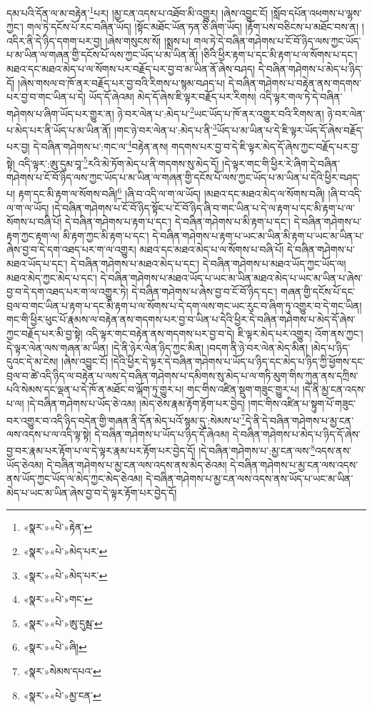 དམ་པའི་དོན་ལ་མ་བརྟེན་\footnote{«སྣར་»«པེ་»རྟེན་}པར། །མྱ་ངན་འདས་པ་འཐོབ་མི་འགྱུར། །ཞེས་འབྱུང་ངོ། །སློབ་དཔོན་འཕགས་པ་ལྷས་ཀྱང་། གལ་ཏེ་དངོས་པོ་རང་བཞིན་ཡོད། །སྟོང་མཐོང་ཡོན་ཏན་ཅི་ཞིག་ཡོད། །རྟོག་པས་བཅིངས་པ་མཐོང་བས་ན། །འདིར་ནི་དེ་ཉིད་དགག་པར་བྱ། །ཞེས་གསུངས་སོ། །སྨྲས་པ། གལ་ཏེ་དེ་བཞིན་གཤེགས་པ་ངོ་བོ་ཉིད་ལས་ཀྱང་ཡོད་པ་མ་ཡིན་ལ་གཞན་གྱི་དངོས་པོ་ལས་ཀྱང་ཡོད་པ་མ་ཡིན་ནོ། །ཅིའི་ཕྱིར་རྟག་པ་དང་མི་རྟག་པ་ལ་སོགས་པ་དང་། མཐའ་དང་མཐའ་མེད་པ་ལ་སོགས་པར་བརྗོད་པར་བྱ་བ་མ་ཡིན་ནོ་ཞེས་བཤད། དེ་བཞིན་གཤེགས་པ་མེད་པ་ཉིད་དོ། །ཞེས་གསལ་བ་ཁོ་ནར་བརྗོད་པར་བྱ་བའི་རིགས་པ་སྙམ་བཤད་པ། དེ་བཞིན་གཤེགས་པ་བརྟེན་ནས་གདགས་པར་བྱ་བ་གང་ཡིན་པ་དེ། ཡོད་དོ་ཞེའམ། མེད་དོ་ཞེས་ཇི་ལྟར་བརྗོད་པར་རིགས། འདི་ལྟར་གལ་ཏེ་དེ་བཞིན་གཤེགས་པ་ཞིག་ཡོད་པར་གྱུར་ན། ཉེ་བར་ལེན་པ་:མེད་པ་\footnote{«སྣར་»«པེ་»མེད་པར་}ཡང་ཡོད་པ་ཁོ་ནར་འགྱུར་བའི་རིགས་ན། ཉེ་བར་ལེན་པ་མེད་པར་ནི་ཡོད་པ་མ་ཡིན་ནོ། །གང་ཉེ་བར་ལེན་པ་:མེད་པ་ནི་\footnote{«སྣར་»«པེ་»མེད་པར་}ཡོད་པ་མ་ཡིན་པ་དེ་ཇི་ལྟར་ཡོད་དོ་ཞེས་བརྗོད་པར་བྱ། དེ་བཞིན་གཤེགས་པ་:གང་ལ་\footnote{«སྣར་»«པེ་»གང་}བརྟེན་ནས། གདགས་པར་བྱ་བ་དེ་ཇི་ལྟར་མེད་དོ་ཞེས་ཀྱང་བརྗོད་པར་བྱ་སྟེ། འདི་ལྟར་:ཨུ་དུམ་བཱ་\footnote{«སྣར་»«པེ་»ཨུ་དུམྦ་}རའི་མེ་ཏོག་མེད་པ་ནི་གདགས་སུ་མེད་དོ། །དེ་ལྟར་གང་གི་ཕྱིར་རེ་ཞིག་དེ་བཞིན་གཤེགས་པ་ངོ་བོ་ཉིད་ལས་ཀྱང་ཡོད་པ་མ་ཡིན་ལ་གཞན་གྱི་དངོས་པོ་ལས་ཀྱང་ཡོད་པ་མ་ཡིན་པ་དེའི་ཕྱིར་བཤད་པ། རྟག་དང་མི་རྟག་ལ་སོགས་བཞི།\footnote{«སྣར་»«པེ་»ཞི།} །ཞི་བ་འདི་ལ་ག་ལ་ཡོད། །མཐའ་དང་མཐའ་མེད་ལ་སོགས་བཞི། །ཞི་བ་འདི་ལ་ག་ལ་ཡོད། །དེ་བཞིན་གཤེགས་པ་ངོ་བོ་ཉིད་སྟོང་པ་ངོ་བོ་ཉིད་ཞི་བ་གང་ཡིན་པ་དེ་ལ་རྟག་པ་དང་མི་རྟག་པ་ལ་སོགས་པ་བཞི་པོ། དེ་བཞིན་གཤེགས་པ་རྟག་པ་དང་། དེ་བཞིན་གཤེགས་པ་མི་རྟག་པ་དང་། དེ་བཞིན་གཤེགས་པ་རྟག་ཀྱང་རྟག་ལ། མི་རྟག་ཀྱང་མི་རྟག་པ་དང་། དེ་བཞིན་གཤེགས་པ་རྟག་པ་ཡང་མ་ཡིན་མི་རྟག་པ་ཡང་མ་ཡིན་པ་ཞེས་བྱ་བ་དེ་དག་འཐད་པར་ག་ལ་འགྱུར། མཐའ་དང་མཐའ་མེད་པ་ལ་སོགས་པ་བཞི་པོ། དེ་བཞིན་གཤེགས་པ་མཐའ་ཡོད་པ་དང་། དེ་བཞིན་གཤེགས་པ་མཐའ་མེད་པ་དང་། དེ་བཞིན་གཤེགས་པ་མཐའ་ཡོད་ཀྱང་ཡོད་ལ། མཐའ་མེད་ཀྱང་མེད་པ་དང་། དེ་བཞིན་གཤེགས་པ་མཐའ་ཡོད་པ་ཡང་མ་ཡིན་མཐའ་མེད་པ་ཡང་མ་ཡིན་པ་ཞེས་བྱ་བ་དེ་དག་འཐད་པར་ག་ལ་འགྱུར་ཏེ། དེ་བཞིན་གཤེགས་པ་ཞེས་བྱ་བ་ངོ་བོ་ཉིད་དང་། གཞན་གྱི་དངོས་པོ་དང་བྲལ་བ་གང་ཡིན་པ་རྟག་པ་དང་མི་རྟག་པ་ལ་སོགས་པ་དེ་དག་ལས་གང་ཡང་རུང་བ་ཞིག་ཏུ་འགྱུར་བ་དེ་གང་ཡིན། གང་གི་ཕྱིར་ཕུང་པོ་རྣམས་ལ་བརྟེན་ནས་གདགས་པར་བྱ་བ་ཡིན་པ་དེའི་ཕྱིར་དེ་བཞིན་གཤེགས་པ་མེད་དོ་ཞེས་ཀྱང་བརྗོད་པར་མི་བྱ་སྟེ། འདི་ལྟར་གང་བརྟེན་ནས་གདགས་པར་བྱ་བ་དེ། ཇི་ལྟར་མེད་པར་འགྱུར། འོག་ནས་ཀྱང་། དེ་ལྟར་ལེན་ལས་གཞན་མ་ཡིན། །དེ་ནི་ཉེར་ལེན་ཉིད་ཀྱང་མིན། །བདག་ནི་ཉེ་བར་ལེན་མེད་མིན། །མེད་པ་ཉིད་དུའང་དེ་མ་ངེས། །ཞེས་འབྱུང་ངོ། །དེའི་ཕྱིར་དེ་ལྟར་དེ་བཞིན་གཤེགས་པ་ཡོད་པ་ཉིད་དང་མེད་པ་ཉིད་ཀྱི་ཕྱོགས་དང་བྲལ་བ་ཚེ་འདི་ཉིད་ལ་བརྟེན་པ་ལས་དེ་བཞིན་གཤེགས་པ་དམིགས་སུ་མེད་པ་ལ་གཏི་མུག་གིས་ཀུན་ནས་དཀྲིས་པའི་སེམས་དང་ལྡན་པ་དེ་ཁོ་ན་མཐོང་བ་ལྐོག་ཏུ་གྱུར་པ། གང་གིས་འཛིན་སྡུག་གཟུང་གྱུར་པ། །དེ་ནི་མྱ་ངན་འདས་པ་ལ། །དེ་བཞིན་གཤེགས་པ་ཡོད་ཅེ་འམ། །མེད་ཅེས་རྣམ་རྟོག་རྟོག་པར་བྱེད། །གང་གིས་འཛིན་པ་སྟུག་པོ་གཟུང་བར་འགྱུར་བ་འདི་ཉིད་བདེན་གྱི་གཞན་ནི་དོན་མེད་པའོ་སྙམ་དུ་:སེམས་པ་\footnote{«སྣར་»སེམས་དཔའ་}དེ་ནི་དེ་བཞིན་གཤེགས་པ་མྱ་ངན་ལས་འདས་པ་ལ་འདི་ལྟ་སྟེ། དེ་བཞིན་གཤེགས་པ་ཡོད་པ་ཉིད་དོ་ཞེའམ། དེ་བཞིན་གཤེགས་པ་མེད་པ་ཉིད་དོ་ཞེས་བྱ་བར་རྣམ་པར་རྟོག་པ་ལ་དེ་ལྟར་རྣམ་པར་རྟོག་པར་བྱེད་དོ། །དེ་བཞིན་གཤེགས་པ་:མྱ་ངན་ལས་\footnote{«སྣར་»«པེ་»མྱ་ངན་}འདས་ནས་ཡོད་ཅེའམ། དེ་བཞིན་གཤེགས་པ་མྱ་ངན་ལས་འདས་ནས་མེད་ཅེའམ། དེ་བཞིན་གཤེགས་པ་མྱ་ངན་ལས་འདས་ནས་ཡོད་ཀྱང་ཡོད་ལ་མེད་ཀྱང་མེད་ཅེའམ། དེ་བཞིན་གཤེགས་པ་མྱ་ངན་ལས་འདས་ནས་ཡོད་པ་ཡང་མ་ཡིན་མེད་པ་ཡང་མ་ཡིན་ཞེས་བྱ་བ་དེ་ལྟར་རྟོག་པར་བྱེད་དོ། 